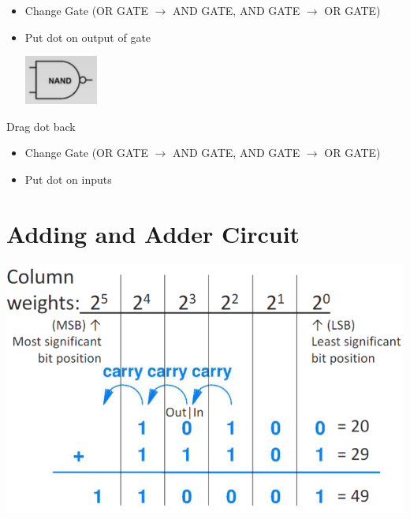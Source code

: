 \documentclass{article}
\begin{document}
    \begin{itemize}
        \item Change Gate (OR GATE $\rightarrow$ AND GATE, AND GATE $\rightarrow$ OR GATE)
        \item Put dot on output of gate
        
        \includegraphics[]{images/dot_drag_after.png}
    \end{itemize}
    
    Drag dot back
    
   \begin{itemize}
       \item Change Gate (OR GATE $\rightarrow$ AND GATE, AND GATE $\rightarrow$ OR GATE)
       
       \item Put dot on inputs
   \end{itemize}


\section{Adding and Adder Circuit}

\includegraphics[scale=0.4]{images/unsigned_adder.png}
\end{document}
